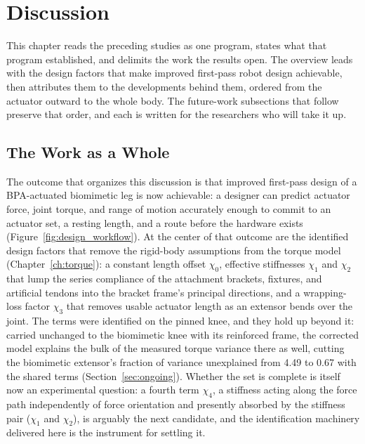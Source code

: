 ﻿\chapter{Discussion}\label{ch:overall}\label{ch:futurework}
\graphicspath{{../Figures/70-overall/}{figs/70-overall/}}

This chapter reads the preceding studies as one program, states what that program established, and delimits the work the results open. The overview leads with the design factors that make improved first-pass robot design achievable, then attributes them to the developments behind them, ordered from the actuator outward to the whole body. The future-work subsections that follow preserve that order, and each is written for the researchers who will take it up.

\section{The Work as a Whole}\label{sec:foundation}

The outcome that organizes this discussion is that improved first-pass design of a BPA-actuated biomimetic leg is now achievable: a designer can predict actuator force, joint torque, and range of motion accurately enough to commit to an actuator set, a resting length, and a route before the hardware exists (Figure~\ref{fig:design_workflow}). At the center of that outcome are the identified design factors that remove the rigid-body assumptions from the torque model (Chapter~\ref{ch:torque}): a constant length offset $\chi_{0}$, effective stiffnesses $\chi_{1}$ and $\chi_{2}$ that lump the series compliance of the attachment brackets, fixtures, and artificial tendons into the bracket frame's principal directions, and a wrapping-loss factor $\chi_{3}$ that removes usable actuator length as an extensor bends over the joint. The terms were identified on the pinned knee, and they hold up beyond it: carried unchanged to the biomimetic knee with its reinforced frame, the corrected model explains the bulk of the measured torque variance there as well, cutting the biomimetic extensor's fraction of variance unexplained from 4.49 to 0.67 with the shared terms (Section~\ref{sec:ongoing}). Whether the set is complete is itself now an experimental question: a fourth term $\chi_{4}$, a stiffness acting along the force path independently of force orientation and presently absorbed by the stiffness pair ($\chi_{1}$ and $\chi_{2}$), is arguably the next candidate, and the identification machinery delivered here is the instrument for settling it.


